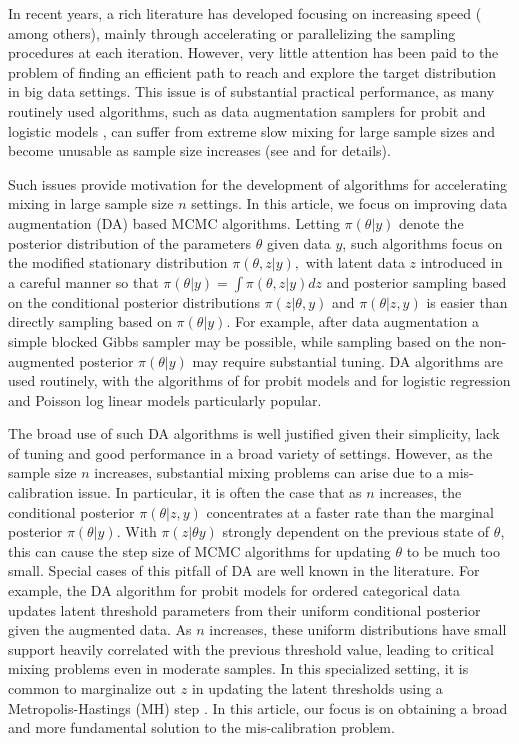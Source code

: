 \documentclass[10pt]{article}
\begin{document}
In recent years, a rich literature has developed focusing on increasing speed (\cite{minsker2014robust,srivastava2015wasp,conrad2015accelerating} among others), mainly through accelerating or parallelizing the sampling procedures at each iteration.  However, very little attention has been paid to the problem of finding an efficient path to reach and explore the target distribution in big data settings. This issue is of substantial practical performance, as many routinely used algorithms, such as data augmentation samplers for probit \citep{albert1993bayesian} and logistic models \citep{polson2013bayesian}, can suffer from extreme slow mixing for large sample sizes and become unusable as sample size increases (see \cite{rajaratnam2015mcmc} and \cite{johndrow2016inefficiency} for details).

Such issues provide motivation for the development of algorithms for accelerating mixing in large sample size $n$ settings.  In this article, we focus on improving data augmentation (DA) based MCMC algorithms.  Letting $\pi( \theta | y )$ denote the posterior distribution of the parameters $\theta$ given data $y$, such algorithms focus on the modified stationary distribution $\pi( \theta, z | y ),$ with latent data $z$ introduced in a careful manner so that $\pi( \theta | y) = \int \pi( \theta, z | y ) dz$ and posterior sampling based on the conditional posterior distributions $\pi(z | \theta, y)$ and $\pi( \theta | z, y)$ is easier than directly sampling based on $\pi( \theta | y)$.   For example, after data augmentation a simple blocked Gibbs sampler may be possible, while sampling based on the non-augmented posterior $\pi( \theta |y)$ may require substantial tuning.  DA algorithms are used routinely, with the algorithms of \cite{albert1993bayesian} for probit models and \cite{polson2013bayesian} for logistic regression and Poisson log linear models particularly popular.  

The broad use of such DA algorithms is well justified given their simplicity, lack of tuning and good performance in a broad variety of settings.  However, as the sample size $n$ increases, substantial mixing problems can arise due to a mis-calibration issue.  In particular, it is often the case that as $n$ increases, the conditional posterior $\pi( \theta | z, y)$ concentrates at a faster rate than the marginal posterior $\pi( \theta | y)$. {\color{red} With $\pi(  z|\theta y)$ strongly dependent on the previous state of $\theta$}, this can cause the step size of MCMC algorithms for updating $\theta$  to be much too small.  Special cases of this pitfall of DA are well known in the literature.  For example, the \cite{albert1993bayesian} DA algorithm for probit models for ordered categorical data updates latent threshold parameters from their uniform conditional posterior given the augmented data.   As $n$ increases, these uniform distributions have small support heavily correlated with the previous threshold value, leading to critical mixing problems even in moderate samples.  In this specialized setting, it is common to marginalize out $z$ in updating the latent thresholds using a Metropolis-Hastings (MH) step \citep{cowles1996accelerating}. In this article, our focus is on obtaining a broad and more fundamental solution to the mis-calibration problem.
\end{document}
